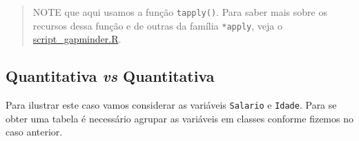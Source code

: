 \documentclass[
  10pt,
  a4paper]{book}
\newenvironment{Shaded}{\begin{snugshade}}{\end{snugshade}}
\newcommand{\AttributeTok}[1]{\textcolor[rgb]{0.77,0.63,0.00}{#1}}
\newcommand{\DecValTok}[1]{\textcolor[rgb]{0.00,0.00,0.81}{#1}}
\newcommand{\FloatTok}[1]{\textcolor[rgb]{0.00,0.00,0.81}{#1}}
\newcommand{\FunctionTok}[1]{\textcolor[rgb]{0.00,0.00,0.00}{#1}}
\newcommand{\NormalTok}[1]{#1}
\newcommand{\SpecialCharTok}[1]{\textcolor[rgb]{0.00,0.00,0.00}{#1}}
\newcommand{\StringTok}[1]{\textcolor[rgb]{0.31,0.60,0.02}{#1}}
\begin{document}
\begin{Shaded}
\end{Shaded}

\begin{quote}
NOTE que aqui usamos a função \texttt{tapply()}. Para saber mais sobre os
recursos dessa função e de outras da família \texttt{*apply}, veja o
\href{scripts/script_gapminder.R}{script\_gapminder.R}.
\end{quote}

\hypertarget{quantitativa-vs-quantitativa}{%
\subsection{\texorpdfstring{Quantitativa \emph{vs} Quantitativa}{Quantitativa vs Quantitativa}}\label{quantitativa-vs-quantitativa}}

Para ilustrar este caso vamos considerar as variáveis \texttt{Salario} e
\texttt{Idade}. Para se obter uma tabela é necessário agrupar as
variáveis em classes conforme fizemos no caso anterior.
\end{document}
